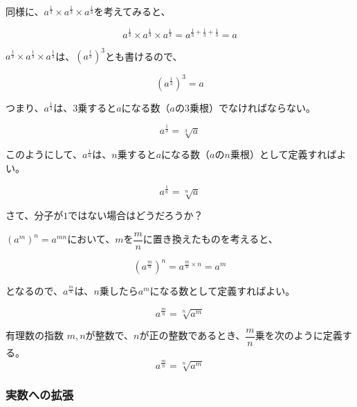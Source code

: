 \documentclass[../math-imaging]{subfiles}
\begin{document}
同様に、$a^{\frac{1}{3}} \times a^{\frac{1}{3}} \times a^{\frac{1}{3}}$を考えてみると、

\begin{equation}
  a^{\frac{1}{3}} \times a^{\frac{1}{3}} \times a^{\frac{1}{3}} = a^{\frac{1}{3} + \frac{1}{3} + \frac{1}{3}} = a
\end{equation}

$a^{\frac{1}{3}} \times a^{\frac{1}{3}} \times a^{\frac{1}{3}}$は、$(a^{\frac{1}{3}})^3$とも書けるので、

\begin{equation}
  (a^{\frac{1}{3}})^3 = a
\end{equation}

つまり、$a^{\frac{1}{3}}$は、3乗すると$a$になる数（$a$の3乗根）でなければならない。

\begin{equation}
  a^{\frac{1}{3}} = \sqrt[3]{a}
\end{equation}

このようにして、$a^{\frac{1}{n}}$は、$n$乗すると$a$になる数（$a$の$n$乗根）として定義すればよい。

\begin{equation}
  a^{\frac{1}{n}} = \sqrt[n]{a}
\end{equation}

さて、分子が$1$ではない場合はどうだろうか？

$(a^m)^n = a^{mn}$において、$m$を$\dfrac{m}{n}$に置き換えたものを考えると、

\begin{equation}
  (a^{\frac{m}{n}})^n = a^{\frac{m}{n} \times n} = a^m
\end{equation}

となるので、$a^{\frac{m}{n}}$は、$n$乗したら$a^m$になる数として定義すればよい。

\begin{equation}
  a^{\frac{m}{n}} = \sqrt[n]{a^m}
\end{equation}

\begin{definition}{有理数の指数}
  \newline
  $m, n$が整数で、$n$が正の整数であるとき、$\dfrac{m}{n}$乗を次のように定義する。
  \LARGE
  \begin{equation}
    a^{\frac{m}{n}} = \sqrt[n]{a^m}
  \end{equation}
\end{definition}

\subsubsection{実数への拡張}
\end{document}
